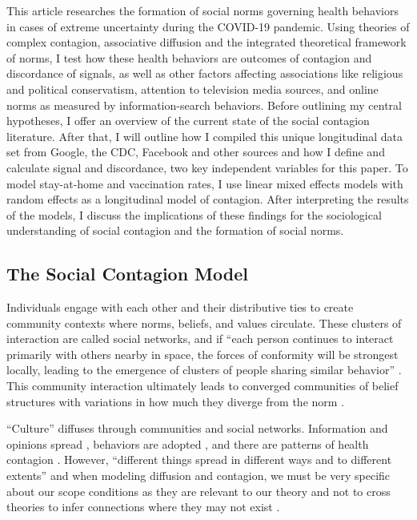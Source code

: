 This article researches the formation of social norms governing health behaviors
in cases of extreme uncertainty during the COVID-19 pandemic. Using theories of complex
contagion, associative diffusion and the integrated theoretical framework of
norms, I test how these health behaviors are outcomes of contagion and
discordance of signals, as well as other factors affecting associations like
religious and political conservatism, attention to television media sources,
and online norms as measured by information-search behaviors. Before outlining
my central hypotheses, I offer an overview of the current state of the social
contagion literature. After that, I will outline how I compiled this unique
longitudinal data set from Google, the CDC, Facebook and other sources and how I
define and calculate signal and discordance, two key independent variables for
this paper. To model stay-at-home and vaccination rates, I use linear mixed effects
models with random effects as a longitudinal model of contagion. After
interpreting the results of the models, I discuss the implications of these
findings for the sociological understanding of social contagion and the
formation of social norms.

\hypertarget{the-social-contagion-model}{%
\subsection{The Social Contagion Model}\label{the-social-contagion-model}}

Individuals engage with each other and their distributive ties to create
community contexts where norms, beliefs, and values circulate. These clusters of
interaction are called social networks, and if ``each person continues to
interact primarily with others nearby in space, the forces of conformity will be
strongest locally, leading to the emergence of clusters of people sharing
similar behavior'' \citep{kitts_shi18}. This community
interaction ultimately leads to converged communities of belief structures with
variations in how much they diverge from the norm \citep{cullumCulturalEvolutionInterpersonal2007, lataneExperimentalEvidenceDynamic1996, okadaStructureCulturalRejection2017}.

``Culture'' diffuses through communities and social networks. Information and
opinions spread \citep{bond_etal12, fowler2010cooperative,klarEffectNetworkStructure2017}, behaviors are adopted \citep{aralExerciseContagionGlobal2017, centolaSpreadBehaviorOnline2010, centolaExperimentalStudyHomophily2011,christakis2008collective,rosenquist2010spread}, and there are patterns of health contagion \citep{cacioppo2009alone,christakisSpreadObesityLarge2007}. However,
``different things spread in different ways and to different extents''
\citep[p. 563]{christakisSocialContagionTheory2013} and when modeling diffusion and
contagion, we must be very specific about our scope conditions as they are
relevant to our theory and not to cross theories to infer connections where they
may not exist \citep{kitts_quintane20}.

